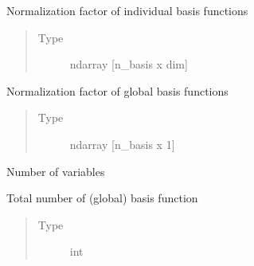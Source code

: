 \documentclass[letterpaper,10pt,english,openany,oneside]{sphinxmanual}
\begin{document}
\begin{fulllineitems}
\begin{fulllineitems}
\end{fulllineitems}


\begin{fulllineitems}
\label{\detokenize{pygpc:pygpc.Basis.Basis.b_norm}}
Normalization factor of individual basis functions
\begin{quote}\begin{description}
\item[{Type}] \leavevmode
ndarray {[}n\_basis x dim{]}

\end{description}\end{quote}

\end{fulllineitems}


\begin{fulllineitems}
\label{\detokenize{pygpc:pygpc.Basis.Basis.b_norm_basis}}
Normalization factor of global basis functions
\begin{quote}\begin{description}
\item[{Type}] \leavevmode
ndarray {[}n\_basis x 1{]}

\end{description}\end{quote}

\end{fulllineitems}


\begin{fulllineitems}
\label{\detokenize{pygpc:pygpc.Basis.Basis.dim}}
Number of variables

\end{fulllineitems}


\begin{fulllineitems}
\label{\detokenize{pygpc:pygpc.Basis.Basis.n_basis}}
Total number of (global) basis function
\begin{quote}\begin{description}
\item[{Type}] \leavevmode
int


\end{description}
\end{quote}
\end{fulllineitems}
\end{fulllineitems}
\end{document}

